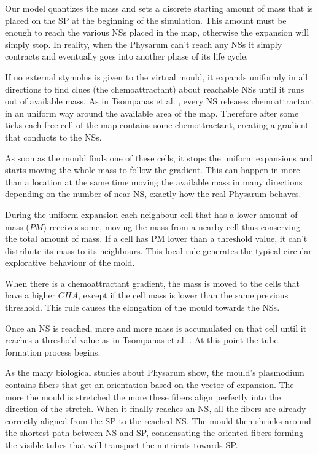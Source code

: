 \par
Our model quantizes the mass and sets a discrete starting amount of mass that is placed on the SP at the beginning of the simulation. This amount must be enough to reach the various NSs placed in the map, otherwise the expansion will simply stop. In reality, when the Physarum can't reach any NSs it simply contracts and eventually goes into another phase of its life cycle.

\par
If no external stymolus is given to the virtual mould, it expands uniformly in all directions to find clues (the chemoattractant) about reachable NSs until it runs out of available mass. As in Tsompanas et al. \cite{Tsompanas2016}, every NS releases chemoattractant in an uniform way around the available area of the map. Therefore after some ticks each free cell of the map contains some chemottractant, creating a gradient that conducts to the NSs.

\par
As soon as the mould finds one of these cells, it stops the uniform expansions and starts moving the whole mass to follow the gradient. This can happen in more than a location at the same time moving the available mass in many directions depending on the number of near NS, exactly how the real Physarum behaves.

\par
During the uniform expansion each neighbour cell that has a lower amount of mass ($PM$) receives some, moving the mass from a nearby cell thus conserving the total amount of mass. If a cell has PM lower than a threshold value, it can't distribute its mass to its neighbours. This local rule generates the typical circular explorative behaviour of the mold.

\par 
When there is a chemoattractant gradient, the mass is moved to the cells that have a higher $CHA$, except if the cell mass is lower than the same previous threshold. This rule causes the elongation of the mould towards the NSs.

\par
Once an NS is reached, more and more mass is accumulated on that cell until it reaches a threshold value as in Tsompanas et al. \cite{Tsompanas2016}. At this point the tube formation process begins.

\par
As the many biological studies about Physarum show, the mould's plasmodium contains fibers that get an orientation based on the vector of expansion. The more the mould is stretched the more these fibers align perfectly into the direction of the stretch. When it finally reaches an NS, all the fibers are already correctly aligned from the SP to the reached NS. The mould then shrinks around the shortest path between NS and SP, condensating the oriented fibers forming the visible tubes that will transport the nutrients towards SP.

